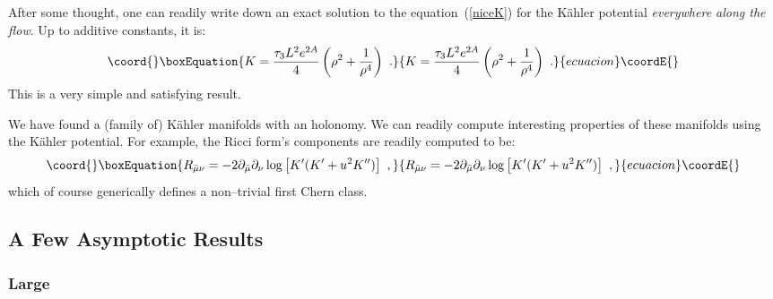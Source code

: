 \documentclass[a4paper,12pt]{article}
\providecommand{\labell}[1]{\label{#1}}
\providecommand{\reef}[1]{(\ref{#1})}
\begin{document}
After some thought, one can readily write down an exact solution to
the equation~\reef{niceK} for the K\"ahler potential {\it everywhere
  along the flow}. Up to additive constants, it is:
\begin{equation}\coord{}\boxEquation{
K = { \tau_3 L^2 e^{2A}  \over 4} \left(\rho^2  + {1\over\rho^{4}}\right)\ .
\labell{exactK}
}{
K = { \tau_3 L^2 e^{2A}  \over 4} \left(\rho^2  + {1\over\rho^{4}}\right)\ .
\labell{exactK}
}{ecuacion}\coordE{}\end{equation}
This is a very simple and satisfying result. 


We have found a (family of) K\"ahler manifolds with an \coordHE{} holonomy. We can readily compute interesting properties of these
manifolds using the K\"ahler potential. For example, the Ricci form's
components are readily computed to be:
\begin{equation}\coord{}\boxEquation{
R_{{\bar\mu}\nu}=
-2\partial_{\bar\mu}\partial_{\nu}\log\left[K'(K'+u^2K'')\right]\ ,
}{
R_{{\bar\mu}\nu}=
-2\partial_{\bar\mu}\partial_{\nu}\log\left[K'(K'+u^2K'')\right]\ ,
}{ecuacion}\coordE{}\end{equation}
which of course generically defines a non--trivial first Chern class.


\subsection{A Few Asymptotic Results}

\subsubsection{Large \coordHE{}}
\label{sec:largeu}
\end{document}
